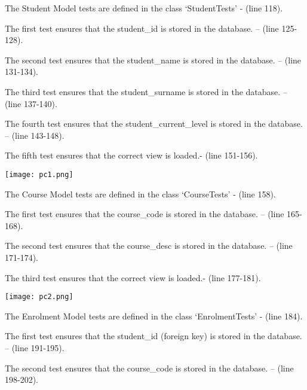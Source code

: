 \documentclass[10pt]{article}
\begin{document}
\begin{description}[font=$\bullet$~\normalfont\scshape\color{red!50!black}]

\item [] The Student Model tests are defined in the class ‘StudentTests’ - (line 118).
\item [] The first test ensures that the student\_id is stored in the database. – (line 125-128).
\item [] The second test ensures that the student\_name is stored in the database. – (line 131-134).
\item [] The third test ensures that the student\_surname is stored in the database. – (line 137-140).
\item [] The fourth test ensures that the student\_current\_level is stored in the database. – (line 143-148).
\item [] The fifth test ensures that the correct view is loaded.- (line 151-156).

\end{description}

\begin{center}
\texttt{[image: pc1.png]}
\end{center}

\begin{description}[font=$\bullet$~\normalfont\scshape\color{red!50!black}]

\item [] The Course Model tests are defined in the class ‘CourseTests’ - (line 158).
\item [] The first test ensures that the course\_code is stored in the database. – (line 165-168).
\item [] The second test ensures that the course\_desc is stored in the database. – (line 171-174).
\item [] The third test ensures that the correct view is loaded.- (line 177-181).
\end{description}

\begin{center}
\texttt{[image: pc2.png]}
\end{center}

\begin{description}[font=$\bullet$~\normalfont\scshape\color{red!50!black}]

\item [] The Enrolment Model tests are defined in the class ‘EnrolmentTests’ - (line 184).
\item [] The first test ensures that the student\_id (foreign key) is stored in the database. – (line 191-195).
\item [] The second test ensures that the course\_code is stored in the database. – (line 198-202).

\end{description}
\end{document}
